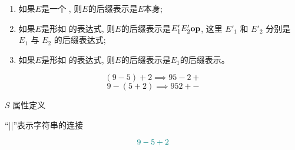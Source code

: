 

\begin{frame}{}
  \begin{definition}
    \begin{enumerate}[(1)]
      \setlength{\itemsep}{8pt}
      \item 如果$E$是一个 , 则$E$的后缀表示是$E$本身;
      \item 如果$E$是形如  的表达式,
        则$E$的后缀表示是$E'_{1} E'_{2} \text{\bf op}$,
        这里 $E'_{1}$ 和 $E'_{2}$ 分别是 $E_{1}$ 与 $E_{2}$ 的后缀表达式;
      \item 如果$E$是形如  的表达式, 则$E$的后缀表示是$E_{1}$的后缀表示。
    \end{enumerate}
  \end{definition}

  \begin{center}
    \[
      (9-5)+2 \implies 95-2+
    \]
    \[
      9-(5+2) \implies 952+-
    \]
  \end{center}
\end{frame}

\begin{frame}{}
  \begin{center}
     $S$ 属性定义


    ``||''表示字符串的连接
  \end{center}
\end{frame}

\begin{frame}{}
  \[
    \textcolor{teal}{9 - 5 + 2}
  \]
\end{frame}

